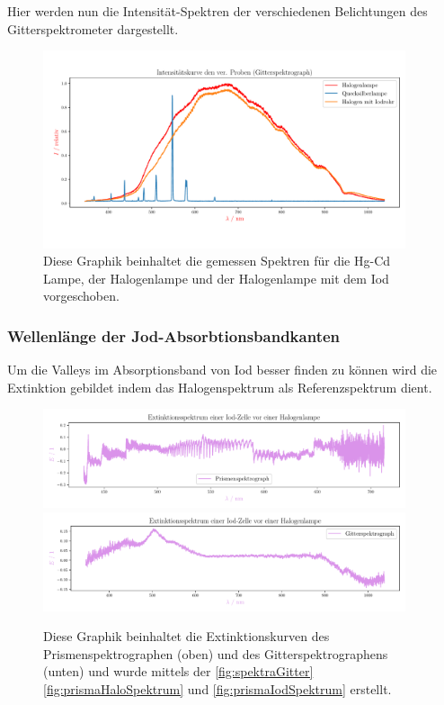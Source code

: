 \documentclass[12pt,english,ngerman]{scrartcl}
\begin{document}
Hier werden nun die Intensität-Spektren der verschiedenen Belichtungen des
Gitterspektrometer dargestellt.

\begin{figure}[H]
	\begin{center}
		\includegraphics[width=0.95\textwidth]{figures/intensity_spektrum_gitter.pdf}
	\end{center}
	\caption{Diese Graphik beinhaltet die gemessen Spektren für die Hg-Cd Lampe,
		der Halogenlampe und der Halogenlampe mit dem Iod vorgeschoben.
	}\label{fig:spektraGitter}
\end{figure}

\subsubsection{Wellenlänge der Jod-Absorbtionsbandkanten}
Um die Valleys im Absorptionsband von Iod besser finden zu können wird die
Extinktion gebildet indem das Halogenspektrum als Referenzspektrum dient. 

\begin{figure}[H]
	\begin{center}
		\includegraphics[width=0.95\textwidth]{figures/prism_extinction.pdf}
		\includegraphics[width=0.95\textwidth]{figures/gitter_extinction.pdf}
	\end{center}
	\caption{Diese Graphik beinhaltet die Extinktionskurven des Prismenspektrographen
		(oben) und des Gitterspektrographens (unten) und wurde mittels der 
		\autoref{fig:spektraGitter} \autoref{fig:prismaHaloSpektrum} und 
		\autoref{fig:prismaIodSpektrum} erstellt.
	}\label{fig:extinktionkurven}
\end{figure}
\end{document}
